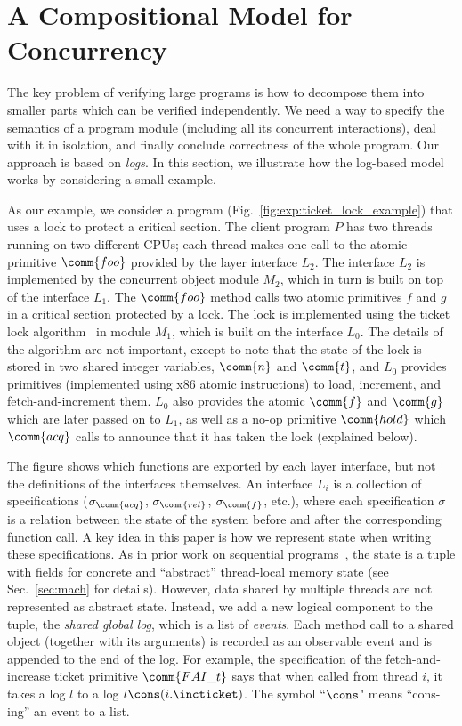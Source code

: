 \section{A Compositional Model for Concurrency}
\label{sec:informal}

The key problem of verifying large programs is how to decompose them
into smaller parts which can be verified independently. We need a way
to specify the semantics of a program module (including all its
concurrent interactions), deal with it in isolation, and finally
conclude correctness of the whole program.  Our approach is based on
\emph{logs}. In this section, we illustrate how the log-based model
works by considering a small example.

As our example, we consider a program
(Fig.~\ref{fig:exp:ticket_lock_example}) that uses a lock to protect a
critical section. The client program $P$ has two threads running on
two different CPUs; each thread makes one call to the atomic primitive
$\comm{foo}$ provided by the layer interface $L_2$.  The interface
$L_2$ is implemented by the concurrent object module $M_2$, which in
turn is built on top of the interface $L_1$. The $\comm{foo}$ method
calls two atomic primitives $f$ and $g$ in a critical section
protected by a lock.  The lock is implemented using the ticket lock
algorithm~\cite{mcs91} in module $M_1$, which is built on the
interface $L_0$. The details of the algorithm are not important,
except to note that the state of the lock is stored in two shared
integer variables, $\comm{n}$ and $\comm{t}$, and $L_0$ provides
primitives (implemented using x86 atomic instructions) to load,
increment, and fetch-and-increment them. $L_0$ also provides the
atomic $\comm{f}$ and $\comm{g}$ which are later passed on to $L_1$,
as well as a no-op primitive $\comm{hold}$ which $\comm{acq}$ calls to
announce that it has taken the lock (explained below).

The figure shows which functions are exported by each layer interface,
but not the definitions of the interfaces themselves. An interface
$L_i$ is a collection of specifications ($\sigma_{\comm{acq}}$,
$\sigma_{\comm{rel}}$, $\sigma_{\comm{f}}$, etc.), where each
specification $\sigma$ is a relation between the state of the system
before and after the corresponding function call. A key idea in this
paper is how we represent state when writing these specifications. As
in prior work on sequential programs~\cite{dscal15}, the state is a
tuple with fields for concrete and ``abstract'' thread-local memory
state (see Sec.~\ref{sec:mach} for details).  However, data shared by
multiple threads are not represented as abstract state. Instead, we
add a new logical component to the tuple, the \emph{shared global
  log}, which is a list of \emph{events}.  Each method call to a
shared object (together with its arguments) is recorded as an
observable event and is appended to the end of the log. For example,
the specification of the fetch-and-increase ticket primitive $\comm{FAI\_t}$ says that when called from thread
$i$, it takes a log $l$ to a log $l \cons (i.\incticket)$.  The symbol
``$\cons$" means ``cons-ing'' an event to a list. 

